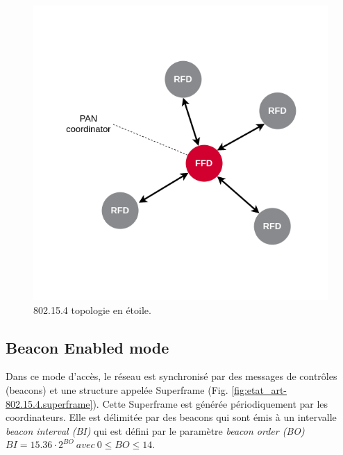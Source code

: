 \begin{figure}[H]
{\begin{minipage}{0.5\textwidth}
      \includegraphics[scale=0.35]{images/802154_topologies_star.png}
      \caption{802.15.4 topologie en étoile.}
      \label{fig:etat_art-802.15.4.topology.star}
    \end{minipage}}
  \end{figure}


\subsection{Beacon Enabled mode}\label{subsec:etat_art-802.15.4.be}
  Dans ce mode d'accès, le réseau est synchronisé par des messages de contrôles (beacons)
  et une structure appelée Superframe (Fig. \ref{fig:etat_art-802.15.4.superframe}).
  Cette Superframe est générée périodiquement par les coordinateurs.
  Elle est délimitée par des beacons qui sont émis à un intervalle \textit{beacon interval (BI)}
  qui est défini par le paramètre \textit{beacon order (BO)}
  $BI = 15.36 \cdot 2^{BO}\ avec\ 0 \leq BO \leq 14$.
  
